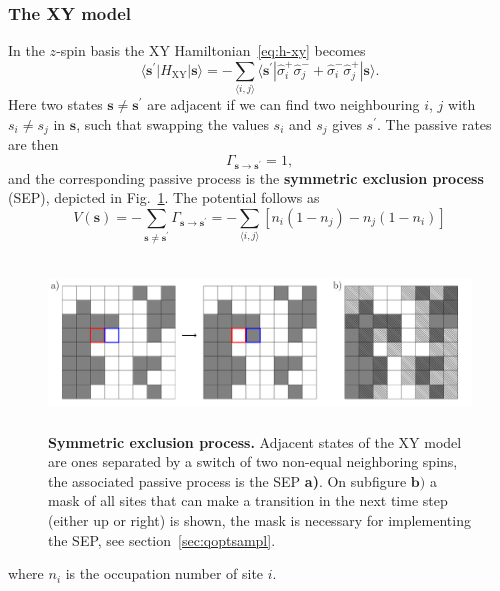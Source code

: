 \subsubsection{The XY model}
\label{subsubsec:res-hm}
In the $z$-spin basis the XY Hamiltonian~\eqref{eq:h-xy} becomes
\begin{equation}
	\langle \mathbf{s}^\prime | H_{\text{XY}} | \mathbf{s} \rangle = -\sum_{\langle i, j \rangle}\langle \mathbf{s}^\prime | \hat \sigma_i^+ \hat \sigma_j^- + \hat \sigma_i^- \hat \sigma_j^+| \mathbf{s}\rangle.
\end{equation}
Here two states $\mathbf{s} \neq \mathbf{s}^\prime$ are adjacent if we can find two neighbouring $i$, $j$ with $s_i \neq s_j$ in $\mathbf{s}$, such that swapping the values $s_i$ and $s_j$ gives $s^\prime$. The passive rates are then
\begin{equation}
	\Gamma_{\mathbf{s}\rightarrow\mathbf{s}^\prime} = 1,
\end{equation}
and the corresponding passive process is the \textbf{symmetric exclusion process} (SEP), depicted in Fig.~\ref{fig:xypassive}. The potential follows as
\begin{equation}
V(\mathbf{s}) = -\sum_{\mathbf{s} \neq \mathbf{s}^\prime} \Gamma_{\mathbf{s}\rightarrow\mathbf{s}^\prime} = -\sum_{\langle i, j \rangle} \left[n_i\left(1-n_j\right) - n_j\left(1-n_i\right)\right]
\end{equation}
\begin{figure}[t]
	\centering
	\includegraphics[height=4.5cm]{Chapter5/Figs/Vector/xy_passive}
	\caption[Symmetric exclusion process]{\textbf{Symmetric exclusion process.} Adjacent states of the XY model are ones separated by a switch of two non-equal neighboring spins, the associated passive process is the SEP \textbf{a)}. On subfigure $\mathbf{b)}$ a mask of all sites that can make a transition in the next time step (either up or right) is shown, the mask is necessary for implementing the SEP, see section~\ref{sec:qoptsampl}.}
	\label{fig:xypassive}
\end{figure}
where $n_i$ is the occupation number of site $i$.
%

